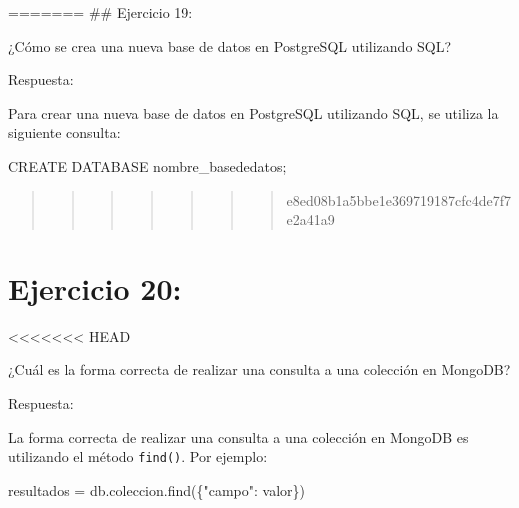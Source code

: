 \documentclass[
  a4paper,
  onepage,
  openany]{scrreprt}
\newenvironment{Shaded}{\begin{snugshade}}{\end{snugshade}}
\newcommand{\KeywordTok}[1]{\textcolor[rgb]{0.00,0.23,0.31}{#1}}
\newcommand{\NormalTok}[1]{\textcolor[rgb]{0.00,0.23,0.31}{#1}}
\newcommand{\OperatorTok}[1]{\textcolor[rgb]{0.37,0.37,0.37}{#1}}
\newcommand{\StringTok}[1]{\textcolor[rgb]{0.13,0.47,0.30}{#1}}
\begin{document}
======= \#\# Ejercicio 19:

¿Cómo se crea una nueva base de datos en PostgreSQL utilizando SQL?

Respuesta:

Para crear una nueva base de datos en PostgreSQL utilizando SQL, se
utiliza la siguiente consulta:

\begin{Shaded}
\begin{Highlighting}[]
\KeywordTok{CREATE} \KeywordTok{DATABASE}\NormalTok{ nombre\_basededatos;}
\end{Highlighting}
\end{Shaded}

\begin{quote}
\begin{quote}
\begin{quote}
\begin{quote}
\begin{quote}
\begin{quote}
\begin{quote}
e8ed08b1a5bbe1e369719187cfc4de7f7e2a41a9
\end{quote}
\end{quote}
\end{quote}
\end{quote}
\end{quote}
\end{quote}
\end{quote}

\hypertarget{ejercicio-20}{%
\chapter{Ejercicio 20:}\label{ejercicio-20}}

\textless\textless\textless\textless\textless\textless\textless{} HEAD

¿Cuál es la forma correcta de realizar una consulta a una colección en
MongoDB?

Respuesta:

La forma correcta de realizar una consulta a una colección en MongoDB es
utilizando el método \texttt{find()}. Por ejemplo:

\begin{Shaded}
\begin{Highlighting}[]
\NormalTok{resultados }\OperatorTok{=}\NormalTok{ db.coleccion.find(\{}\StringTok{"campo"}\NormalTok{: valor\})}
\end{Highlighting}
\end{Shaded}
\end{document}
